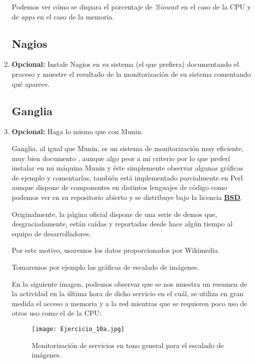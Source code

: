 \documentclass[paper=a4, fontsize=11pt]{scrartcl} %
\numberwithin{equation}{section} %
\numberwithin{figure}{section} %
\numberwithin{table}{section} %
\begin{document}
\begin{enumerate}
		Podemos ver cómo se dispara el porcentaje de \textit{\%iowait} en el caso de la CPU y de
		\textit{apps} en el caso de la memoria.
		
	\subsection{Nagios}
		\item \textbf{Opcional:} Instale Nagios en su sistema (el que prefiera) documentando el
		proceso y muestre el resultado de la monitorización de su sistema comentando qué aparece.
		
	\subsection{Ganglia}
		\item \textbf{Opcional:} Haga lo mismo que con Munin.
		
		Ganglia, al igual que Munin, es un sistema de monitorización muy eficiente, muy bien documento
		\cite{ganglia_official}, aunque algo peor a mi criterio por lo que preferí instalar en mi
		máquina Munin y éste simplemente observar algunas gráficas de ejemplo y comentarlas, también
		está implementado parcialmente en Perl aunque dispone de componentes en distintos lenguajes de
		código como podemos ver en su repositorio abierto\cite{ganglia_github} y se distribuye bajo la
		licencia \href{http://www.freebsd.org/copyright/license.html}{\textbf{BSD}}.
		
		Originalmente, la página oficial dispone de una serie de demos\cite{ganglia_demo} que,
		desgraciadamente, están caídas y reportadas\cite{ganglia_issue} desde hace algún tiempo al
		equipo de desarrolladores.
		
		Por este motivo, usaremos los datos proporcionados por Wikimedia\cite{ganglia_WM}.
		
		Tomaremos por ejemplo las gráficas de escalado de imágenes.
		
		En la siguiente imagen, podemos observar que se nos muestra un resumen de la actividad en la
		última hora de dicho servicio en el cuál, se utiliza en gran medida el acceso a memoria y a la
		red mientras que se requieren poco uso de otros uso como el de la CPU\cite{ganglia_WM_1}:
		
		\begin{figure}[H]
			\centering
			\texttt{[image: Ejercicio\_10a.jpg]}
			\caption{Monitorización de servicios en tono general para el escalado de imágenes.}
			\label{fig:Ganglia_general}
		\end{figure}
		

\end{enumerate}
\end{document}
